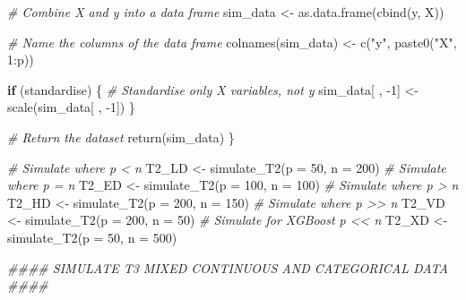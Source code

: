 \documentclass[
  11pt,
]{article}
\newenvironment{Shaded}{}{}
\newcommand{\AttributeTok}[1]{\textcolor[rgb]{0.49,0.56,0.16}{#1}}
\newcommand{\CommentTok}[1]{\textcolor[rgb]{0.38,0.63,0.69}{\textit{#1}}}
\newcommand{\ControlFlowTok}[1]{\textcolor[rgb]{0.00,0.44,0.13}{\textbf{#1}}}
\newcommand{\DecValTok}[1]{\textcolor[rgb]{0.25,0.63,0.44}{#1}}
\newcommand{\DocumentationTok}[1]{\textcolor[rgb]{0.73,0.13,0.13}{\textit{#1}}}
\newcommand{\FunctionTok}[1]{\textcolor[rgb]{0.02,0.16,0.49}{#1}}
\newcommand{\NormalTok}[1]{#1}
\newcommand{\OtherTok}[1]{\textcolor[rgb]{0.00,0.44,0.13}{#1}}
\newcommand{\SpecialCharTok}[1]{\textcolor[rgb]{0.25,0.44,0.63}{#1}}
\newcommand{\StringTok}[1]{\textcolor[rgb]{0.25,0.44,0.63}{#1}}
\begin{document}
\begin{Shaded}
\begin{Highlighting}[]
  \CommentTok{\# Combine X and y into a data frame}
\NormalTok{  sim\_data }\OtherTok{\textless{}{-}} \FunctionTok{as.data.frame}\NormalTok{(}\FunctionTok{cbind}\NormalTok{(y, X))}
  
  \CommentTok{\# Name the columns of the data frame}
  \FunctionTok{colnames}\NormalTok{(sim\_data) }\OtherTok{\textless{}{-}} \FunctionTok{c}\NormalTok{(}\StringTok{"y"}\NormalTok{, }\FunctionTok{paste0}\NormalTok{(}\StringTok{"X"}\NormalTok{, }\DecValTok{1}\SpecialCharTok{:}\NormalTok{p))}
  
  \ControlFlowTok{if}\NormalTok{ (standardise) \{}
    \CommentTok{\# Standardise only X variables, not y}
\NormalTok{    sim\_data[ , }\SpecialCharTok{{-}}\DecValTok{1}\NormalTok{] }\OtherTok{\textless{}{-}} \FunctionTok{scale}\NormalTok{(sim\_data[ , }\SpecialCharTok{{-}}\DecValTok{1}\NormalTok{])}
\NormalTok{  \}}
  
  \CommentTok{\# Return the dataset}
  \FunctionTok{return}\NormalTok{(sim\_data)}
\NormalTok{\}}

\CommentTok{\# Simulate where p \textless{} n}
\NormalTok{T2\_LD }\OtherTok{\textless{}{-}} \FunctionTok{simulate\_T2}\NormalTok{(}\AttributeTok{p =} \DecValTok{50}\NormalTok{, }\AttributeTok{n =} \DecValTok{200}\NormalTok{)}
\CommentTok{\# Simulate where p = n}
\NormalTok{T2\_ED }\OtherTok{\textless{}{-}} \FunctionTok{simulate\_T2}\NormalTok{(}\AttributeTok{p =} \DecValTok{100}\NormalTok{, }\AttributeTok{n =} \DecValTok{100}\NormalTok{)}
\CommentTok{\# Simulate where p \textgreater{} n}
\NormalTok{T2\_HD }\OtherTok{\textless{}{-}} \FunctionTok{simulate\_T2}\NormalTok{(}\AttributeTok{p =} \DecValTok{200}\NormalTok{, }\AttributeTok{n =} \DecValTok{150}\NormalTok{)}
\CommentTok{\# Simulate where p \textgreater{}\textgreater{} n}
\NormalTok{T2\_VD }\OtherTok{\textless{}{-}} \FunctionTok{simulate\_T2}\NormalTok{(}\AttributeTok{p =} \DecValTok{200}\NormalTok{, }\AttributeTok{n =} \DecValTok{50}\NormalTok{)}
\CommentTok{\# Simulate for XGBoost p \textless{}\textless{} n}
\NormalTok{T2\_XD }\OtherTok{\textless{}{-}} \FunctionTok{simulate\_T2}\NormalTok{(}\AttributeTok{p =} \DecValTok{50}\NormalTok{, }\AttributeTok{n =} \DecValTok{500}\NormalTok{)}

\DocumentationTok{\#\#\#\# SIMULATE T3 MIXED CONTINUOUS AND CATEGORICAL DATA \#\#\#\#}


\end{Highlighting}
\end{Shaded}
\end{document}
